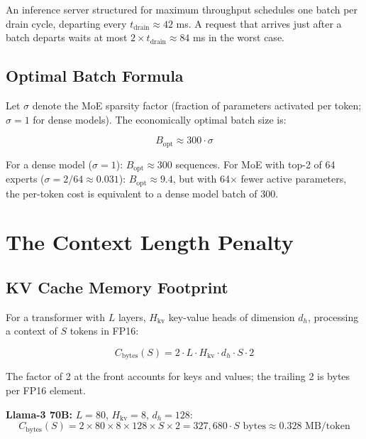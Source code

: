 \documentclass[11pt,a4paper]{article}
\begin{document}
An inference server structured for maximum throughput schedules one batch
per drain cycle, departing every $t_\text{drain} \approx 42$ ms. A request
that arrives just after a batch departs waits at most $2 \times t_\text{drain}
\approx 84$ ms in the worst case.

\subsection{Optimal Batch Formula}

Let $\sigma$ denote the MoE sparsity factor (fraction of parameters activated
per token; $\sigma=1$ for dense models). The economically optimal batch size is:

\begin{equation}
  B_\text{opt} \approx 300 \cdot \sigma
  \label{eq:optimal-batch}
\end{equation}

For a dense model ($\sigma=1$): $B_\text{opt} \approx 300$ sequences.
For MoE with top-2 of 64 experts ($\sigma = 2/64 \approx 0.031$):
$B_\text{opt} \approx 9.4$, but with 64× fewer active parameters,
the per-token cost is equivalent to a dense model batch of 300.

\section{The Context Length Penalty}
\label{sec:context}

\subsection{KV Cache Memory Footprint}

For a transformer with $L$ layers, $H_\text{kv}$ key-value heads of
dimension $d_h$, processing a context of $S$ tokens in FP16:

\begin{equation}
  C_\text{bytes}(S) = 2 \cdot L \cdot H_\text{kv} \cdot d_h \cdot S \cdot 2
  \label{eq:kv-cache}
\end{equation}

The factor of 2 at the front accounts for keys and values; the trailing 2
is bytes per FP16 element.

\textbf{Llama-3 70B:} $L=80$, $H_\text{kv}=8$, $d_h=128$:
\[
  C_\text{bytes}(S) = 2 \times 80 \times 8 \times 128 \times S \times 2
                    = 327{,}680 \cdot S \text{ bytes} \approx 0.328 \text{ MB/token}
\]
\end{document}
